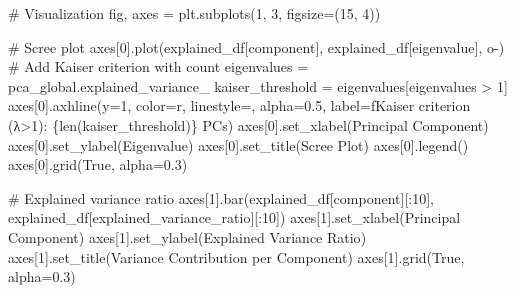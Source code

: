 \documentclass[
  letterpaper,
  DIV=11,
  numbers=noendperiod]{scrartcl}
\newenvironment{Shaded}{\begin{snugshade}}{\end{snugshade}}
\newcommand{\BuiltInTok}[1]{\textcolor[rgb]{0.00,0.23,0.31}{#1}}
\newcommand{\CommentTok}[1]{\textcolor[rgb]{0.37,0.37,0.37}{#1}}
\newcommand{\DecValTok}[1]{\textcolor[rgb]{0.68,0.00,0.00}{#1}}
\newcommand{\FloatTok}[1]{\textcolor[rgb]{0.68,0.00,0.00}{#1}}
\newcommand{\NormalTok}[1]{\textcolor[rgb]{0.00,0.23,0.31}{#1}}
\newcommand{\OperatorTok}[1]{\textcolor[rgb]{0.37,0.37,0.37}{#1}}
\newcommand{\SpecialCharTok}[1]{\textcolor[rgb]{0.37,0.37,0.37}{#1}}
\newcommand{\SpecialStringTok}[1]{\textcolor[rgb]{0.13,0.47,0.30}{#1}}
\newcommand{\StringTok}[1]{\textcolor[rgb]{0.13,0.47,0.30}{#1}}
\newcommand{\VariableTok}[1]{\textcolor[rgb]{0.07,0.07,0.07}{#1}}
\renewenvironment{Shaded}{%
  \begin{tcolorbox}[%
    enhanced,%
    colback=codebg,%
    colframe=codebg,%
    borderline west={3pt}{0pt}{sectionblue},%
    fontupper=\small\ttfamily,%
    boxrule=0pt,%
    arc=0pt,%
    boxsep=5pt,%
    left=2mm,%
    right=2mm,%
    top=2mm,%
    bottom=2mm%
  ]%
}{%
  \end{tcolorbox}%
}
\begin{document}
\begin{Shaded}
\begin{Highlighting}[]
\CommentTok{\# Visualization}
\NormalTok{fig, axes }\OperatorTok{=}\NormalTok{ plt.subplots(}\DecValTok{1}\NormalTok{, }\DecValTok{3}\NormalTok{, figsize}\OperatorTok{=}\NormalTok{(}\DecValTok{15}\NormalTok{, }\DecValTok{4}\NormalTok{))}

\CommentTok{\# Scree plot}
\NormalTok{axes[}\DecValTok{0}\NormalTok{].plot(explained\_df[}\StringTok{\textquotesingle{}component\textquotesingle{}}\NormalTok{], explained\_df[}\StringTok{\textquotesingle{}eigenvalue\textquotesingle{}}\NormalTok{], }\StringTok{\textquotesingle{}o{-}\textquotesingle{}}\NormalTok{)}
\CommentTok{\# Add Kaiser criterion with count}
\NormalTok{eigenvalues }\OperatorTok{=}\NormalTok{ pca\_global.explained\_variance\_}
\NormalTok{kaiser\_threshold }\OperatorTok{=}\NormalTok{ eigenvalues[eigenvalues }\OperatorTok{\textgreater{}} \DecValTok{1}\NormalTok{]}
\NormalTok{axes[}\DecValTok{0}\NormalTok{].axhline(y}\OperatorTok{=}\DecValTok{1}\NormalTok{, color}\OperatorTok{=}\StringTok{\textquotesingle{}r\textquotesingle{}}\NormalTok{, linestyle}\OperatorTok{=}\StringTok{\textquotesingle{}{-}{-}\textquotesingle{}}\NormalTok{, alpha}\OperatorTok{=}\FloatTok{0.5}\NormalTok{, }
\NormalTok{                label}\OperatorTok{=}\SpecialStringTok{f\textquotesingle{}Kaiser criterion (λ\textgreater{}1): }\SpecialCharTok{\{}\BuiltInTok{len}\NormalTok{(kaiser\_threshold)}\SpecialCharTok{\}}\SpecialStringTok{ PCs\textquotesingle{}}\NormalTok{)}
\NormalTok{axes[}\DecValTok{0}\NormalTok{].set\_xlabel(}\StringTok{\textquotesingle{}Principal Component\textquotesingle{}}\NormalTok{)}
\NormalTok{axes[}\DecValTok{0}\NormalTok{].set\_ylabel(}\StringTok{\textquotesingle{}Eigenvalue\textquotesingle{}}\NormalTok{)}
\NormalTok{axes[}\DecValTok{0}\NormalTok{].set\_title(}\StringTok{\textquotesingle{}Scree Plot\textquotesingle{}}\NormalTok{)}
\NormalTok{axes[}\DecValTok{0}\NormalTok{].legend()}
\NormalTok{axes[}\DecValTok{0}\NormalTok{].grid(}\VariableTok{True}\NormalTok{, alpha}\OperatorTok{=}\FloatTok{0.3}\NormalTok{)}

\CommentTok{\# Explained variance ratio}
\NormalTok{axes[}\DecValTok{1}\NormalTok{].bar(explained\_df[}\StringTok{\textquotesingle{}component\textquotesingle{}}\NormalTok{][:}\DecValTok{10}\NormalTok{], explained\_df[}\StringTok{\textquotesingle{}explained\_variance\_ratio\textquotesingle{}}\NormalTok{][:}\DecValTok{10}\NormalTok{])}
\NormalTok{axes[}\DecValTok{1}\NormalTok{].set\_xlabel(}\StringTok{\textquotesingle{}Principal Component\textquotesingle{}}\NormalTok{)}
\NormalTok{axes[}\DecValTok{1}\NormalTok{].set\_ylabel(}\StringTok{\textquotesingle{}Explained Variance Ratio\textquotesingle{}}\NormalTok{)}
\NormalTok{axes[}\DecValTok{1}\NormalTok{].set\_title(}\StringTok{\textquotesingle{}Variance Contribution per Component\textquotesingle{}}\NormalTok{)}
\NormalTok{axes[}\DecValTok{1}\NormalTok{].grid(}\VariableTok{True}\NormalTok{, alpha}\OperatorTok{=}\FloatTok{0.3}\NormalTok{)}


\end{Highlighting}
\end{Shaded}
\end{document}
